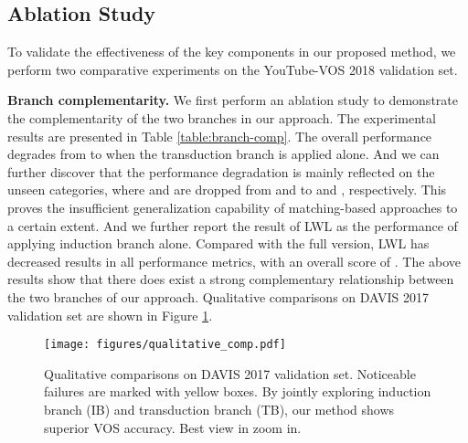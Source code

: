 \documentclass[10pt,twocolumn,letterpaper]{article}
\begin{document}
\subsection{Ablation Study}
To validate the effectiveness of the key components in our proposed method, we perform two comparative experiments on the YouTube-VOS 2018 \cite{Xu2018YouTubeVOSAL} validation set.

\noindent\textbf{Branch complementarity.}
We first perform an ablation study to demonstrate the complementarity of the two branches in our approach. The experimental results are presented in Table \ref{table:branch-comp}. The overall performance degrades from  to  when the transduction branch is applied alone. And we can further discover that the performance degradation is mainly reflected on the unseen categories, where  and  are dropped from  and  to  and , respectively. This proves the insufficient generalization capability of matching-based approaches to a certain extent. And we further report the result of LWL \cite{Goutam2020A} as the performance of applying induction branch alone. Compared with the full version, LWL \cite{Goutam2020A} has decreased results in all performance metrics, with an overall score of . The above results show that there does exist a strong complementary relationship between the two branches of our approach. Qualitative comparisons on DAVIS 2017 validation set are shown in Figure \ref{fig:qualitative_comp}.

\begin{figure}[htbp]
	\begin{center}
\texttt{[image: figures/qualitative\_comp.pdf]}
	\vspace{-2.0em}
	\end{center}
	\caption{Qualitative comparisons on DAVIS 2017 validation set.
		Noticeable failures are marked with yellow boxes. By jointly exploring induction branch (IB) and transduction branch (TB), our method shows superior VOS accuracy. Best view in zoom in.}
	\label{fig:qualitative_comp}
	\vspace{-1.0em}
\end{figure}
\end{document}
